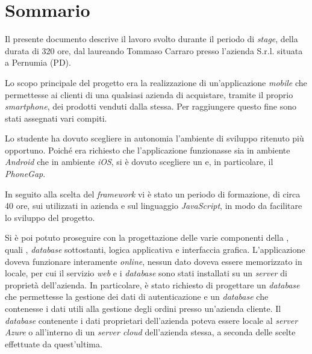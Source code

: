 
\cleardoublepage
{}
{}
\begingroup
\let\clearpage\relax
\let\cleardoublepage\relax
\let\cleardoublepage\relax

\chapter*{Sommario}

Il presente documento descrive il lavoro svolto durante il periodo di \textit{stage}, della durata di 320 ore, dal laureando Tommaso Carraro presso l'azienda \visione{} S.r.l. situata a Pernumia (PD).

Lo scopo principale del progetto era la realizzazione di un'applicazione \textit{mobile} che permettesse ai clienti di una qualsiasi azienda di acquistare, tramite il proprio \textit{smartphone}, dei prodotti venduti dalla stessa. Per raggiungere questo fine sono stati assegnati vari compiti.

Lo studente ha dovuto scegliere in autonomia l'ambiente di sviluppo ritenuto più opportuno. Poiché era richiesto che l'applicazione funzionasse sia in ambiente \textit{Android} che in ambiente \textit{iOS}, si è dovuto scegliere un  e, in particolare, il  \textit{PhoneGap}.

In seguito alla scelta del \textit{framework} vi è stato un periodo di formazione, di circa 40 ore, sui  utilizzati in azienda e sul linguaggio \textit{JavaScript}, in modo da facilitare lo sviluppo del progetto.

Si è poi potuto proseguire con la progettazione delle varie componenti della , quali , \textit{database} sottostanti, logica applicativa e interfaccia grafica. 
L'applicazione doveva funzionare interamente \textit{online}, nessun dato doveva essere memorizzato in locale, per cui il servizio \textit{web} e i \textit{database} sono stati installati su un \textit{server}  di proprietà dell'azienda.
In particolare, è stato richiesto di progettare un \textit{database} che permettesse la gestione dei dati di autenticazione e un \textit{database} che contenesse i dati utili alla gestione degli ordini presso un'azienda cliente. Il \textit{database} contenente i dati proprietari dell'azienda poteva essere locale al \textit{server Azure} o all'interno di un \textit{server cloud} dell'azienda stessa, a seconda delle scelte effettuate da quest'ultima.

